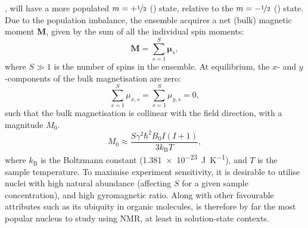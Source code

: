 , will have a more populated $m = +\nicefrac{1}{2}$ (\textalpha) state,
relative to the $m = -\nicefrac{1}{2}$ (\textbeta) state.  Due to the
population imbalance, the ensemble acquires a net (bulk) magnetic moment
$\symbf{M}$, given by the sum of all the individual spin moments:
\begin{equation}
    \symbf{M} = \sum\limits_{s=1}^{S} \symbf{\mu}_s,
\end{equation}
where $S \gg 1$ is the number of spins in the ensemble.
At equilibrium, the $x$- and $y$-components of the bulk magnetisation are zero:
\begin{equation}
    \sum_{s=1}^{S} \mu_{x,s} = \sum_{s=1}^{S} \mu_{y,s} = 0,
\end{equation}
such that the bulk magnetisation is collinear with the field direction, with a
magnitude $M_0$.
\label{corr:high-temp}
\begin{equation}
    M_0 \approx \frac{S \gamma^2 \hbar^2 B_0 I (I + 1)}{3 k_{\text{B}} T},
    \label{eq:M0}
\end{equation}
where $k_{\text{B}}$ is the Boltzmann constant
(\qty{1.381e-23}{\joule\per\kelvin}),
and $T$ is the sample temperature. To maximise experiment sensitivity, it is
desirable to
utilise nuclei with high natural abundance (affecting $S$ for a given sample
concentration), and high
gyromagnetic ratio. Along with other favourable attributes such as its ubiquity
in organic molecules,  is therefore by far the most popular nucleus to
study using \ac{NMR}, at least in solution-state contexts.

